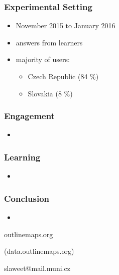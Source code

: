 \documentclass[bigger]{beamer}
\begin{document}
\begin{frame}
	\frametitle{Experimental Setting}
	\begin{itemize}
		\item November 2015 to January 2016
		\item {} answers from  learners
		\item majority of users:
			\begin{itemize}
				\item Czech Republic (84 \%)
				\item Slovakia (8 \%)
			\end{itemize}
	\end{itemize}
\end{frame}

\begin{frame}
  \frametitle{Engagement}
	\begin{itemize}
		\item 
	\end{itemize}

\end{frame}


\begin{frame}
  \frametitle{Learning}
	\begin{itemize}
		\item 
	\end{itemize}

\end{frame}


\begin{frame}
  \frametitle{Conclusion}
	\begin{itemize}
		\item 
	\end{itemize}

\end{frame}




\begin{frame}
	\begin{center}
		{\Huge outlinemaps.org}

		\medskip
		(data.outlinemaps.org)

		\bigskip
		\bigskip
		slaweet@mail.muni.cz
	\end{center}
\end{frame}
\end{document}
